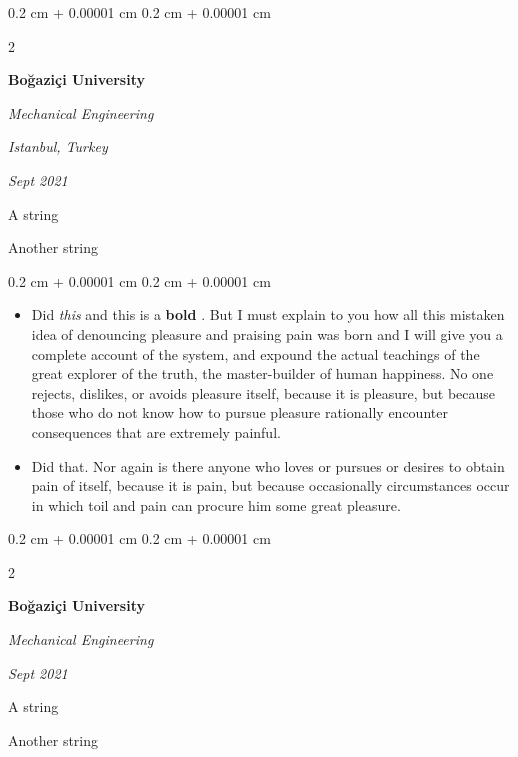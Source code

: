 \documentclass[10pt, letterpaper]{article}
\newenvironment{summary}{
    \begin{description}[
        topsep=0.10 cm,
        parsep=0.10 cm,
        partopsep=0pt,
        itemsep=0pt,
        leftmargin=0.4 cm + 10pt
    ]
}{
    \end{description}
} %
\newenvironment{highlights}{
    \begin{itemize}[
        topsep=0.10 cm,
        parsep=0.10 cm,
        partopsep=0pt,
        itemsep=0pt,
        leftmargin=0.4 cm + 10pt
    ]
}{
    \end{itemize}
} %
\newenvironment{onecolentry}{
    \begin{adjustwidth}{
        0.2 cm + 0.00001 cm
    }{
        0.2 cm + 0.00001 cm
    }
}{
    \end{adjustwidth}
} %
\newenvironment{twocolentry}[2][]{
    \onecolentry
    \def\secondColumn{#2}
    \setcolumnwidth{\fill, 4.5 cm}
    \begin{paracol}{2}
}{
    \switchcolumn \raggedleft \secondColumn
    \end{paracol}
    \endonecolentry
} %
\let\hrefWithoutArrow\href
\renewcommand{\href}[2]{\hrefWithoutArrow{#1}{\ifthenelse{\equal{#2}{}}{ }{#2 }\raisebox{.15ex}{\footnotesize \faExternalLink*}}}
\begin{document}
        \begin{twocolentry}{
        \textit{Istanbul, Turkey}    
            
        \textit{Sept 2021}}
            \textbf{Boğaziçi University}

            \textit{Mechanical Engineering}
        \end{twocolentry}
            \begin{summary}
                \item A string
                \item Another string
            \end{summary}
        \vspace{0.10 cm}
        \begin{onecolentry}
            \begin{highlights}
                \item Did \textit{this} and this is a \textbf{bold} \href{https://example.com}{link}. But I must explain to you how all this mistaken idea of denouncing pleasure and praising pain was born and I will give you a complete account of the system, and expound the actual teachings of the great explorer of the truth, the master-builder of human happiness. No one rejects, dislikes, or avoids pleasure itself, because it is pleasure, but because those who do not know how to pursue pleasure rationally encounter consequences that are extremely painful.
                \item Did that. Nor again is there anyone who loves or pursues or desires to obtain pain of itself, because it is pain, but because occasionally circumstances occur in which toil and pain can procure him some great pleasure.
            \end{highlights}
        \end{onecolentry}


        \vspace{0.2 cm}

        \begin{twocolentry}{
            
            
        \textit{Sept 2021}}
            \textbf{Boğaziçi University}

            \textit{Mechanical Engineering}
        \end{twocolentry}
            \begin{summary}
                \item A string
                \item Another string
            \end{summary}
\end{document}
